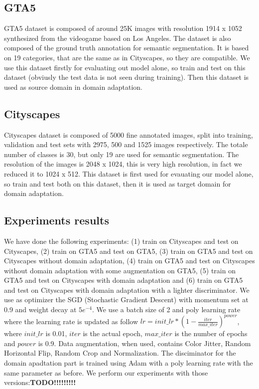 \documentclass[conference]{IEEEtran}
\begin{document}
\subsection{GTA5}
GTA5 dataset \cite{b4} is composed of around 25K images with resolution 1914 x 1052 synthesized from the videogame based on Los Angeles.
The dataset is also composed of the ground truth annotation for semantic segmentation. It is based on 19 categories, that are the same
as in Cityscapes, so they are compatible. We use this dataset firstly for evaluating out model alone, so train and test on this dataset
(obviusly the test data is not seen during training). Then this dataset is used as source domain in domain adaptation.
\subsection{Cityscapes}
Cityscapes dataset \cite{b5} is composed of 5000 fine annotated images, split into training, validation and test sets with 2975, 500
and 1525 images respectively. The totale number of classes is 30, but only 19 are used for semantic segmentation. The resolution of the
images is 2048 x 1024, this is very high resolution, in fact we reduced it to 1024 x 512. This dataset is first used for evauating our
model alone, so train and test both on this dataset, then it is used as target domain for domain adaptation. 
\subsection{Experiments results}

We have done the following experiments: (1) train on Cityscapes and test on Cityscapes, (2) train on GTA5 and test on GTA5, (3) train on 
GTA5 and test on Cityscapes without domain adaptation, (4) train on GTA5 and test on Cityscapes without domain adaptation with some
augmentation on GTA5, (5) train on GTA5 and test on Cityscapes with domain adaptation and (6) train on GTA5 and test on Cityscapes with
domain adaptation with a lighter discriminator. 
We use as optimizer the SGD (Stochastic Gradient Descent) with momentum set at 0.9 and weight decay at \(5e^{-4}\). We use a batch size of
2 and poly learning rate where the learning rate is updated as follow \(lr = init\_lr * (1 - \frac{iter}{max\_iter})^{power}\), where
\(init\_lr\) is 0.01, \(iter\) is the actual epoch, \(max\_iter\) is the number of epochs and \(power\) is 0.9. Data augmentation, when
used, contains Color Jitter, Random Horizontal Flip, Random Crop and Normalization. The disciminator for the domain apadtation part
is trained using Adam with a poly learning rate with the same parameter as before. 
We perform our experiments with those versions:\textbf{TODO!!!!!!!!!}
\end{document}
